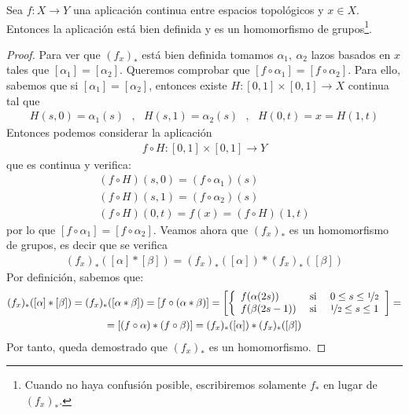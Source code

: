 \begin{lema}
    Sea $f:X\to Y$ una aplicación continua entre espacios topológicos y $x\in X$. Entonces la aplicación
    está bien definida y es un homomorfismo de grupos\footnote{Cuando no haya confusión posible, escribiremos solamente $f_*$ en lugar de $(f_x)_*$.}.

    \begin{proof}
        Para ver que $(f_x)_*$ está bien definida tomamos $\alpha_1,\ \alpha_2$ lazos basados en $x$ tales que $[\alpha_1] = [\alpha_2]$. Queremos comprobar que $[f\circ \alpha_1] = [f\circ \alpha_2]$. Para ello, sabemos que si $[\alpha_1] = [\alpha_2]$, entonces existe $H:[0,1]\times [0,1]\to X$ continua tal que
        \begin{gather*}
            H(s,0) =\alpha_1(s)\ \ \  ,\ \ \ H(s,1) = \alpha_2(s)\ \ \ , \ \ \ H(0,t)=x=H(1,t)
        \end{gather*}
        Entonces podemos considerar la aplicación 
        \begin{align*}
            f\circ H : [0,1]\times [0,1] \to Y
        \end{align*}
        que es continua y verifica:
        \begin{gather*}
            (f\circ H) (s,0) = (f \circ \alpha_1)(s)\\
            (f\circ H) (s,1) = (f\circ \alpha_2)(s)\\
            (f\circ H) (0,t) = f(x) = (f\circ H) (1,t)
        \end{gather*}
        por lo que $[f\circ \alpha_1] = [f\circ \alpha_2]$. Veamos ahora que $(f_x)_*$ es un homomorfismo de grupos, es decir que se verifica
        \begin{gather*}
            (f_x)_* ([\alpha] \ast [\beta] ) = (f_x)_* ([\alpha]) \ast (f_x)_* ([\beta])
        \end{gather*}
        Por definición, sabemos que:
        \begin{gather*}
            (f_x)_* ([\alpha] \ast [\beta] ) = (f_x)_*([\alpha \ast \beta]) = [f\circ(\alpha \ast \beta)] = \left[\left\{
                \begin{array}{l c c}
                    f(\alpha(2s)) & \text{ si } & 0\leq s \leq \nicefrac{1}{2}\\
                    f(\beta(2s-1)) & \text{ si } & \nicefrac{1}{2} \leq s \leq 1\\
                \end{array}
            \right.\right]=\\
            =[(f\circ \alpha) \ast (f\circ \beta)] = (f_x)_* ([\alpha]) \ast (f_x)_* ([\beta])
        \end{gather*}
        Por tanto, queda demostrado que $(f_x)_*$ es un homomorfismo.
    \end{proof}
\end{lema}

